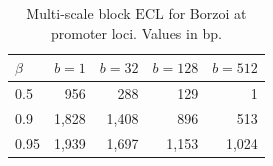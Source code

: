 \begin{table}[t]
\centering
\caption{Multi-scale block $\mathrm{ECL}$ for Borzoi at promoter loci. Values in bp.}
\label{tab:multiscale_block}
\begin{tabular}{lrrrr}
\toprule
$\beta$ & $b=1$ & $b=32$ & $b=128$ & $b=512$ \\
\midrule
0.5 & 956 & 288 & 129 & 1 \\
0.9 & 1,828 & 1,408 & 896 & 513 \\
0.95 & 1,939 & 1,697 & 1,153 & 1,024 \\
\bottomrule
\end{tabular}
\end{table}
